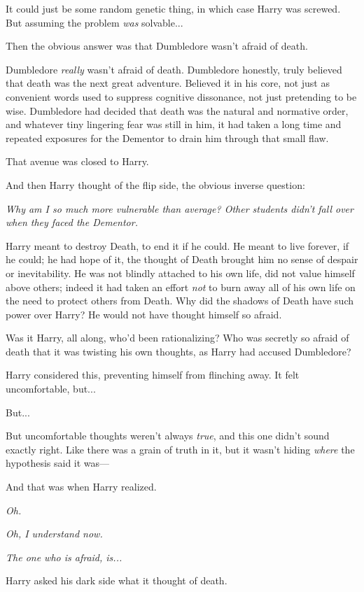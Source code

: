 It could just be some random genetic thing, in which case Harry was screwed. But assuming the problem \emph{was} solvable...

Then the obvious answer was that Dumbledore wasn’t afraid of death.

Dumbledore \emph{really} wasn’t afraid of death. Dumbledore honestly, truly believed that death was the next great adventure. Believed it in his core, not just as convenient words used to suppress cognitive dissonance, not just pretending to be wise. Dumbledore had decided that death was the natural and normative order, and whatever tiny lingering fear was still in him, it had taken a long time and repeated exposures for the Dementor to drain him through that small flaw.

That avenue was closed to Harry.

And then Harry thought of the flip side, the obvious inverse question:

\emph{Why am I so much more vulnerable than average? Other students didn’t fall over when they faced the Dementor.}

Harry meant to destroy Death, to end it if he could. He meant to live forever, if he could; he had hope of it, the thought of Death brought him no sense of despair or inevitability. He was not blindly attached to his own life, did not value himself above others; indeed it had taken an effort \emph{not} to burn away all of his own life on the need to protect others from Death. Why did the shadows of Death have such power over Harry? He would not have thought himself so afraid.

Was it Harry, all along, who’d been rationalizing? Who was secretly so afraid of death that it was twisting his own thoughts, as Harry had accused Dumbledore?

Harry considered this, preventing himself from flinching away. It felt uncomfortable, but...

But...

But uncomfortable thoughts weren’t always \emph{true}, and this one didn’t sound exactly right. Like there was a grain of truth in it, but it wasn’t hiding \emph{where} the hypothesis said it was—

And that was when Harry realized.

\emph{Oh.}

\emph{Oh, I understand now.}

\emph{The one who is afraid, is...}

Harry asked his dark side what it thought of death.

